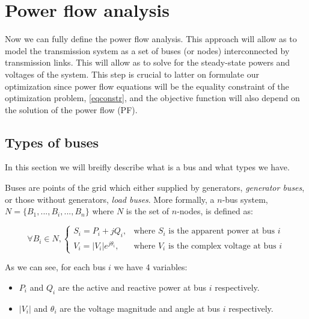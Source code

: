 \documentclass[a4paper,11pt, titlepage, twoside]{article}
\begin{document}
\section{Power flow analysis} \label{fulltransmission}

Now we can fully define the power flow analysis.  This approach will allow as to model the transmission system as a set of buses (or nodes)
interconnected by transmission links. This will allow as to solve for the steady-state powers and voltages of the system. This step is crucial to latter on
formulate our optimization since power flow equations will be the equality constraint of the optimization problem, \ref{eqconstr}, and the objective function will also depend on the solution of the power flow (PF).

\subsection{Types of buses}

In this section we will breifly describe what is a bus and what types we have.\par
Buses are points of the grid which either supplied by generators, \textit{generator buses}, or those without generators, \textit{load buses}. More formally, a $n$-bus system, $N=\{B_1,...,B_i,...,B_n\}$ where $N$ is the set of $n$-nodes, is defined as:

\begin{equation}
    \forall B_i \in N,
    \begin{cases}
        S_i = P_i + jQ_i, & \text{where } S_i \text{ is the apparent power at bus } i \\
        V_i = |V_i|e^{j\theta_i}, & \text{where } V_i \text{ is the complex voltage at bus } i
    \end{cases}
\end{equation}

As we can see, for each bus $i$ we have 4 variables:

\begin{itemize}
    \item $P_i$ and $Q_i$ are the active and reactive power at bus $i$ respectively.
    \item $|V_i|$ and $\theta_i$ are the voltage magnitude and angle at bus $i$ respectively.
\end{itemize}
\end{document}
